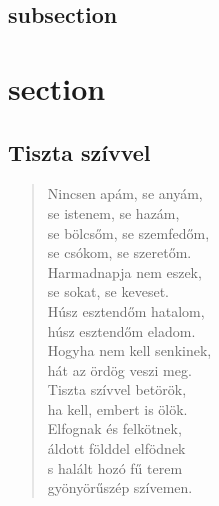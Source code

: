 \documentclass[twocolumn]{book}
\begin{document}
\subsection{subsection}
\section{section}
\begin{quotation}
	\hulipsum[1-2]
\end{quotation}

\clearpage
{}
\subsection{Tiszta szívvel}
\begin{verse}
	\begin{center}
		Nincsen apám, se anyám,\\
		se istenem, se hazám,\\
		se bölcsőm, se szemfedőm,\\
		se csókom, se szeretőm.\\
		
		Harmadnapja nem eszek,\\
		se sokat, se keveset.\\
		Húsz esztendőm hatalom,\\
		húsz esztendőm eladom.\\
		
		Hogyha nem kell senkinek,\\
		hát az ördög veszi meg.\\
		Tiszta szívvel betörök,\\
		ha kell, embert is ölök.\\
		
		Elfognak és felkötnek,\\
		áldott földdel elfödnek\\
		s halált hozó fű terem\\
		gyönyörűszép szívemen.\\
	\end{center}
\end{verse}
\end{document}
